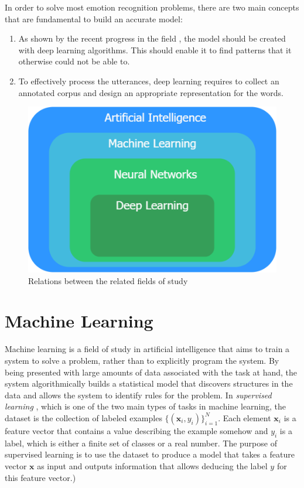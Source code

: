 \documentclass[nofilelist]{cslthse-msc}
\begin{document}
In order to solve most emotion recognition problems, there are two main concepts that are fundamental to build an accurate model:
\begin{enumerate}
\item As shown by the recent progress in the field \citep{deep_survey}, the model should be created with deep learning algorithms. This should enable it to find patterns that it otherwise could not be able to. 
\item To effectively process the utterances, deep learning requires to collect an annotated corpus and design an appropriate representation for the words.
\end{enumerate}


\begin{figure}[h!]
    \centering
    \includegraphics[scale=0.4]{msccls/explanatory_images/map_of_techniques.png}
    \caption{Relations between the related fields of study }
    \label{fig:map}
\end{figure}

\section{Machine Learning}
Machine learning \citep{franoischollet2017learning} is a field of study in artificial intelligence that aims to train a system to solve a problem, rather than to explicitly program the system. By being presented with large amounts of data associated with the task at hand, the system algorithmically builds a statistical model that discovers structures in the data and allows the system to identify rules for the problem. 
In \textit{supervised learning} \citep{100pageBurkov}, which is one of the two main types of tasks in machine learning, the dataset is the collection of labeled examples $\{(\mathbf{x}_i, y_i)\}_{i=1}^N.$ Each element $\mathbf{x}_i$ is a feature vector that contains a value describing the example somehow and $y_i$ is a label, which is either a finite set of classes or a real number. The purpose of supervised learning is to use the dataset to produce a model that takes a feature vector $\mathbf{x}$ as input and outputs information that allows deducing the label $y$ for this feature vector.) 
\end{document}
